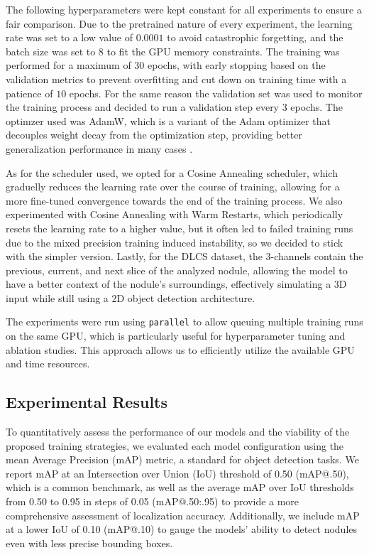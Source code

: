 The following hyperparameters were kept constant for all experiments to ensure a fair comparison.
Due to the pretrained nature of every experiment, the learning rate was set to a low value of $0.0001$ to avoid catastrophic forgetting, and the batch size was set to $8$ to fit the GPU memory constraints. The training was performed for a maximum of $30$ epochs, with early stopping based on the validation metrics to prevent overfitting and cut down on training time with a patience of $10$ epochs. For the same reason the validation set was used to monitor the training process and decided to run a validation step every $3$ epochs.
The optimzer used was AdamW, which is a variant of the Adam optimizer that decouples weight decay from the optimization step, providing better generalization performance in many cases \cite{loshchilov2019decoupled, kingma2017adam}.

As for the scheduler used, we opted for a Cosine Annealing scheduler, which graduelly reduces the learning rate over the course of training, allowing for a more fine-tuned convergence towards the end of the training process. We also experimented with Cosine Annealing with Warm Restarts, which periodically resets the learning rate to a higher value, but it often led to failed training runs due to the mixed precision training induced instability, so we decided to stick with the simpler version.
Lastly, for the DLCS dataset, the 3-channels contain the previous, current, and next slice of the analyzed nodule, allowing the model to have a better context of the nodule's surroundings, effectively simulating a 3D input while still using a 2D object detection architecture.

The experiments were run using \texttt{parallel} to allow queuing multiple training runs on the same GPU, which is particularly useful for hyperparameter tuning and ablation studies. This approach allows us to efficiently utilize the available GPU and time resources.

\subsection{Experimental Results}
To quantitatively assess the performance of our models and the viability of the proposed training strategies, we evaluated each model configuration using the mean Average Precision (mAP) metric, a standard for object detection tasks. We report mAP at an Intersection over Union (IoU) threshold of 0.50 (mAP@.50), which is a common benchmark, as well as the average mAP over IoU thresholds from 0.50 to 0.95 in steps of 0.05 (mAP@.50:.95) to provide a more comprehensive assessment of localization accuracy. Additionally, we include mAP at a lower IoU of 0.10 (mAP@.10) to gauge the models' ability to detect nodules even with less precise bounding boxes.

